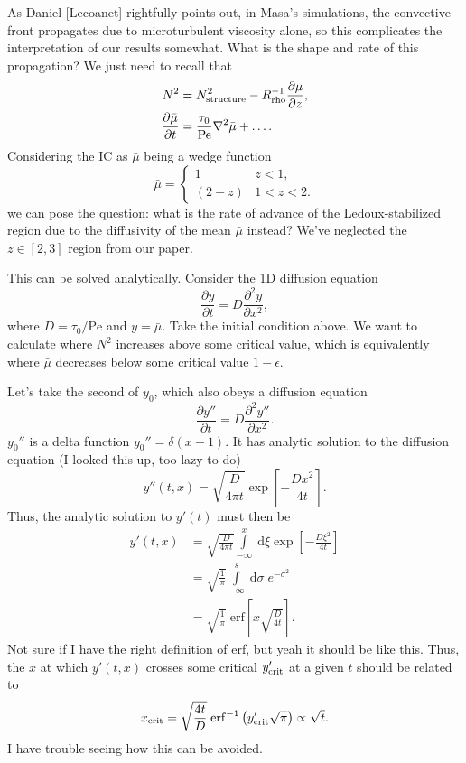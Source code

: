 \documentclass[12pt]{article}
\newcommand*{\pd}[2]{\frac{\partial#1}{\partial#2}}
\newcommand*{\ptd}[2]{\frac{\partial^2 #1}{\partial#2^2}}
\newcommand*{\p}[1]{\left(#1\right)}
\newcommand*{\s}[1]{\left[#1\right]}
\begin{document}
As Daniel [Lecoanet] rightfully points out, in Masa's simulations, the
convective front propagates due to microturbulent viscosity alone, so this
complicates the interpretation of our results somewhat.
What is the shape and rate of this propagation?
We just need to recall that
\begin{align}
    N^2 &= N^2_{\rm structure} - R_{\rm rho}^{-1}\pd{\mu}{z},\\
    \pd{\bar{\mu}}{t}
        &= \frac{\tau_0}{\mathrm{Pe}}\nabla^2\bar{\mu}
            + \dots.
\end{align}
Considering the IC as $\bar{\mu}$ being a wedge function
\begin{equation}
    \bar{\mu}
        =
        \begin{cases}
            1 & z < 1,\\
            (2 - z) & 1 < z < 2.
        \end{cases}
\end{equation}
we can pose the question: what is the rate of advance of the Ledoux-stabilized
region due to the diffusivity of the mean $\bar{\mu}$ instead?
We've neglected the $z \in [2, 3]$ region from our paper.

This can be solved analytically. Consider the 1D diffusion equation
\begin{equation}
    \pd{y}{t}
        = D\ptd{y}{x},
\end{equation}
where $D = \tau_0 / \mathrm{Pe}$ and $y = \bar{\mu}$.
Take the initial condition above.
We want to calculate where $N^2$ increases above some critical value, which is
equivalently where $\bar{\mu}$ decreases below some critical value $1 -
\epsilon$.

Let's take the second of $y_0$, which also obeys a diffusion equation
\begin{equation}
    \pd{y''}{t}
        = D\ptd{y''}{x}.
\end{equation}
$y_0''$ is a delta function $y_0'' = \delta\p{x - 1}$. It has analytic solution
to the diffusion equation (I looked this up, too lazy to do)
\begin{equation}
    y''(t, x) = \sqrt{\frac{D}{4\pi t}}\exp\s{-\frac{Dx^2}{4t}}.
\end{equation}
Thus, the analytic solution to $y'(t)$ must then be
\begin{align}
    y'(t, x)
        &= \sqrt{\frac{D}{4\pi t}}
            \int\limits_{-\infty}^x\;\mathrm{d}\xi\exp\s{-\frac{D\xi^2}{4t}}
            \nonumber\\
        &= \sqrt{\frac{1}{\pi}}
            \int\limits_{-\infty}^s\;\mathrm{d}\sigma\;e^{-\sigma^2}
            \nonumber\\
        &= \sqrt{\frac{1}{\pi}}\;\mathrm{erf}\s{x\sqrt{\frac{D}{4t}}}.
\end{align}
Not sure if I have the right definition of erf, but yeah it should be like this.
Thus, the $x$ at which $y'(t, x)$ crosses some critical $y'_{\rm crit}$ at a
given $t$ should be related to
\begin{equation}
    x_{\rm crit}
        = \sqrt{\frac{4t}{D}}\;\mathrm{erf}^{-1}\p{y'_{\rm crit}\sqrt{\pi}}
            \propto \sqrt{t}.
\end{equation}
I have trouble seeing how this can be avoided.
\end{document}
